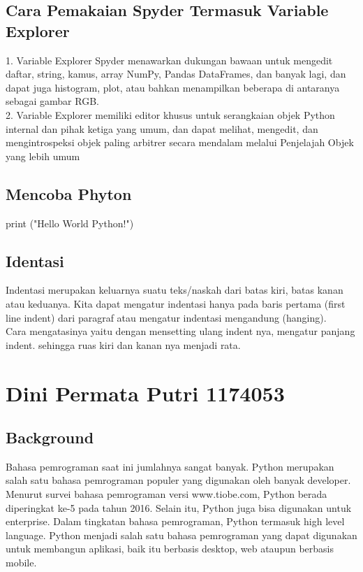 \subsection{Cara Pemakaian Spyder Termasuk Variable Explorer}
1. Variable Explorer Spyder menawarkan dukungan bawaan untuk mengedit daftar, string, kamus, array NumPy, Pandas DataFrames, dan banyak lagi, dan dapat juga histogram, plot, atau bahkan menampilkan beberapa di antaranya sebagai gambar RGB.\\
2. Variable Explorer memiliki editor khusus untuk serangkaian objek Python internal dan pihak ketiga yang umum, dan dapat melihat, mengedit, dan mengintrospeksi objek paling arbitrer secara mendalam melalui Penjelajah Objek yang lebih umum\\

\subsection{Mencoba Phyton}
print ("Hello World Python!")

\subsection{Identasi}
Indentasi merupakan keluarnya suatu teks/naskah dari batas kiri, batas kanan atau keduanya. Kita dapat mengatur indentasi hanya pada baris pertama (first line indent) dari paragraf atau mengatur indentasi mengandung (hanging).\\

Cara mengatasinya yaitu dengan mensetting ulang indent nya, mengatur panjang indent. sehingga ruas kiri dan kanan nya menjadi rata.


\section{Dini Permata Putri 1174053}
\subsection{Background}
Bahasa pemrograman saat ini jumlahnya sangat banyak. Python merupakan salah satu bahasa
pemrograman populer yang digunakan oleh banyak developer. Menurut survei bahasa pemrograman
versi www.tiobe.com, Python berada diperingkat ke-5 pada tahun 2016. Selain itu, Python juga bisa
digunakan untuk enterprise. Dalam tingkatan bahasa pemrograman, Python termasuk high level
language. Python menjadi salah satu bahasa pemrograman yang dapat digunakan untuk membangun
aplikasi, baik itu berbasis desktop, web ataupun berbasis mobile.
